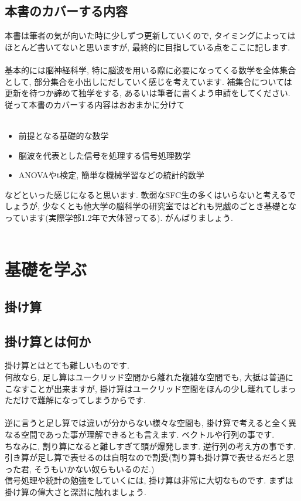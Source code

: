 \documentclass[11pt,a4paper]{jsarticle}
\begin{document}
\subsection{本書のカバーする内容}
本書は筆者の気が向いた時に少しずつ更新していくので, タイミングによってはほとんど書いてないと思いますが, 最終的に目指している点をここに記します.\\
\\
基本的には脳神経科学, 特に脳波を用いる際に必要になってくる数学を全体集合として, 部分集合を小出しにだしていく感じを考えています. 補集合については更新を待つか諦めて独学をする, あるいは筆者に書くよう申請をしてください. 従って本書のカバーする内容はおおまかに分けて\\
\\
\begin{itemize}
 \item 前提となる基礎的な数学
 \item 脳波を代表とした信号を処理する信号処理数学
 \item ANOVAやt検定, 簡単な機械学習などの統計的数学
\end{itemize}

などといった感じになると思います. 軟弱なSFC生の多くはいらないと考えるでしょうが, 少なくとも他大学の脳科学の研究室ではどれも児戯のごとき基礎となっています(実際学部1.2年で大体習ってる). がんばりましょう.
\\
\\
\section{基礎を学ぶ}
\subsection{掛け算}
\subsection{掛け算とは何か}
掛け算とはとても難しいものです.\\
何故なら, 足し算はユークリッド空間から離れた複雑な空間でも, 大抵は普通にこなすことが出来ますが, 掛け算はユークリッド空間をほんの少し離れてしまっただけで難解になってしまうからです. \\
\\
逆に言うと足し算では違いが分からない様々な空間も, 掛け算で考えると全く異なる空間であった事が理解できるとも言えます. ベクトルや行列の事です.\\
ちなみに, 割り算になると難しすぎて頭が爆発します. 逆行列の考え方の事です. \\
引き算が足し算で表せるのは自明なので割愛(割り算も掛け算で表せるだろと思った君, そうもいかない奴らもいるのだ.)\\
信号処理や統計の勉強をしていくには, 掛け算は非常に大切なものです. まずは掛け算の偉大さと深淵に触れましょう.\\
\\
\end{document}
